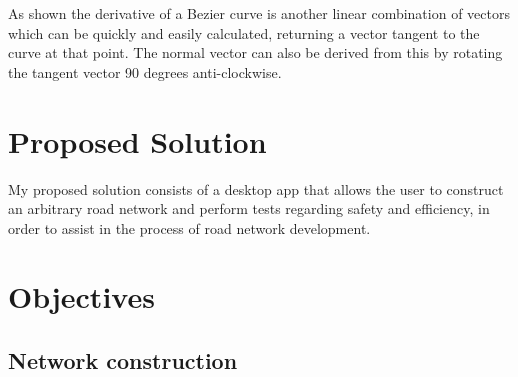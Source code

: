         As shown the derivative of a Bezier curve is another linear combination of vectors which can be quickly and easily calculated, returning a vector tangent to the curve at that point. The normal vector can also be derived from this by rotating the tangent vector 90 degrees anti-clockwise.

\section{Proposed Solution}

    My proposed solution consists of a desktop app that allows the user to construct an arbitrary road network and perform tests regarding safety and efficiency, in order to assist in the process of road network development.

\section{Objectives}

    \subsection{Network construction}

